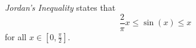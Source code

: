 \documentclass[12pt]{article}
\begin{document}

\emph{Jordan's Inequality} states that
$$ \frac{2}{\pi}x\leq\sin(x)\leq x $$ 
for all $x\in [0,\frac{\pi}{2}]$.
\end{document}
